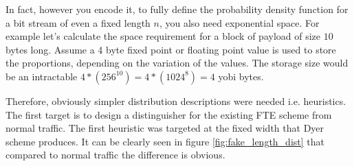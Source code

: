 \documentclass[10pt,a4paper]{article}
\begin{document}
In fact, however you encode it, to fully define the probability density function for a bit stream of even a fixed length $n$, you also need exponential space. For example let's calculate the space requirement for a block of payload of size $10$ bytes long. Assume a 4 byte fixed point or floating point value is used to store the proportions, depending on the variation of the values. The storage size would be an intractable $4*(256^10) = 4*(1024^8) = 4$ yobi bytes.

Therefore, obviously simpler distribution descriptions were needed i.e. heuristics. The first target is to design a distinguisher for the existing FTE scheme from normal traffic. The first heuristic was targeted at the fixed width that Dyer scheme produces. It can be clearly seen in figure \ref{fig:fake_length_dist} that compared to normal traffic the difference is obvious.
\end{document}
